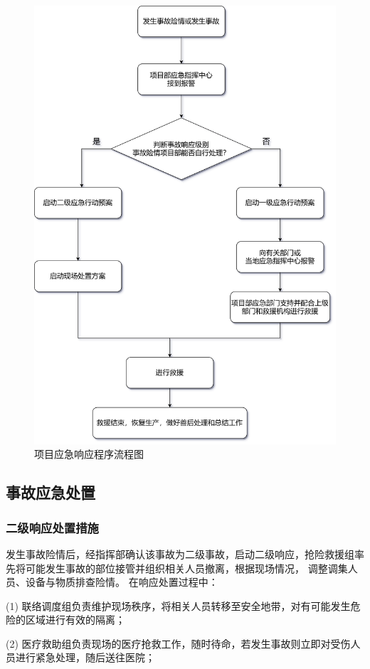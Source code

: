 \begin{figure}[thbp!]
    \centering
    \includegraphics[width=0.8\linewidth]{figure/c8f2.png}
    \caption{项目应急响应程序流程图}
    \label{fig:c8f2}
\end{figure}

\subsection{事故应急处置}

\subsubsection{二级响应处置措施}

发生事故险情后，经指挥部确认该事故为二级事故，启动二级响应，抢险救援组率先将可能发生事故的部位接管并组织相关人员撤离，根据现场情况， 调整调集人员、设备与物质排查险情。
在响应处置过程中：

(1) 联络调度组负责维护现场秩序，将相关人员转移至安全地带，对有可能发生危险的区域进行有效的隔离；

(2) 医疗救助组负责现场的医疗抢救工作，随时待命，若发生事故则立即对受伤人员进行紧急处理，随后送往医院；

